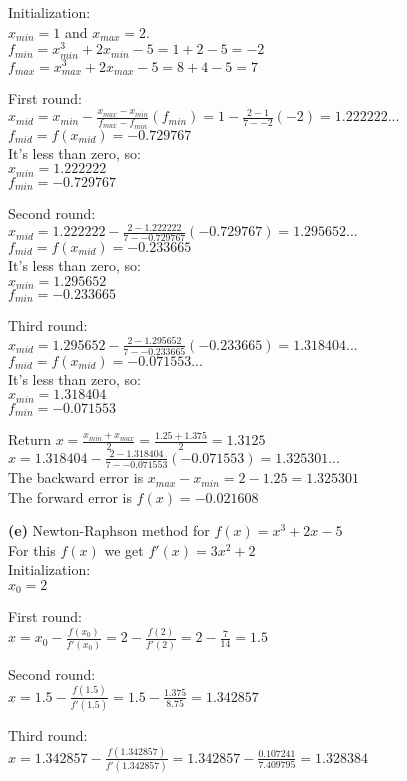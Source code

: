 \documentclass[11pt,letterpaper]{article}
\renewcommand{\part}[1] {\vspace{.10in} {\bf (#1)}}
\begin{document}
Initialization:\\
$x_{min} = 1$ and $x_{max} = 2$.\\
$f_{min} = x_{min}^{3} + 2x_{min} - 5 = 1 + 2 - 5 = -2$\\
$f_{max} = x_{max}^{3} + 2x_{max} - 5 = 8 + 4 - 5 = 7$\\

\newcommand{\xmid}[4]{{#1} - \frac{{#2} - {#1}}{{#4} - {#3}}({#3})}

First round:\\
$x_{mid} = \xmid{x_{min}}{x_{max}}{f_{min}}{f_{max}} = \xmid{1}{2}{{-2}}{7} = 1.222222...$\\
$f_{mid} = f(x_{mid}) = -0.729767 $\\
It's less than zero, so:\\
$x_{min} = 1.222222$\\
$f_{min} = -0.729767$

Second round:\\
$x_{mid} = \xmid{1.222222}{2}{{-0.729767}}{7} = 1.295652...$\\
$f_{mid} = f(x_{mid}) = -0.233665 $\\
It's less than zero, so:\\
$x_{min} = 1.295652 $\\
$f_{min} = -0.233665 $

Third round:\\
$x_{mid}  = \xmid{1.295652}{2}{{-0.233665}}{7} = 1.318404...$\\
$f_{mid} = f(x_{mid}) = -0.071553... $\\
It's less than zero, so:\\
$x_{min} = 1.318404$\\
$f_{min} = -0.071553$

Return $x = \frac{x_{min} + x_{max}}{2} = \frac{1.25 + 1.375}{2} = 1.3125$\\
$x = \xmid{1.318404}{2}{{-0.071553}}{7} = 1.325301...$\\
The backward error is $x_{max} - x_{min} = 2 - 1.25 = 1.325301 $\\
The forward error is $f(x) = -0.021608$

\part{e}
Newton-Raphson method for $f(x) = x^{3} + 2x - 5$\\
For this $f(x)$ we get $f'(x) = 3x^{2} + 2$\\

Initialization:\\
$x_0 = 2$

\newcommand{\newtx}[1]{#1 - \frac{f(#1)}{f'(#1)}}
\newcommand{\newtxx}[3]{#1 - \frac{#2}{#3}}
First round:\\
$x = \newtx{{x_0}} = \newtx{2} = \newtxx{2}{7}{14} = 1.5$

Second round:\\
$x =  \newtx{1.5} = \newtxx{1.5}{1.375}{8.75} = 1.342857$

Third round:\\
$x = \newtx{1.342857} = \newtxx{1.342857}{0.107241}{7.409795} = 1.328384$
\end{document}
